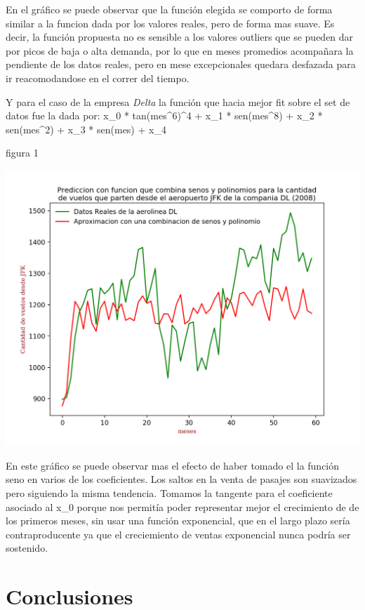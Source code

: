\documentclass{endm}
\begin{document}
En el gr\'afico se puede observar que la funci\'on elegida se comporto de forma similar a la funcion dada por los valores reales, pero de forma mas suave. Es decir, la funci\'on propuesta no es sensible a los valores outliers que se pueden dar por picos de baja o alta demanda, por lo que en meses promedios acompa\~nara la pendiente de los datos reales, pero en mese excepcionales quedara desfazada para ir reacomodandose en el correr del tiempo.

Y para el caso de la empresa \textit{Delta} la funci\'on que hacia mejor fit sobre el set de datos fue la dada por:
x_0 * tan(mes^6)^4 + x_1 * sen(mes^8) + x_2 * sen(mes^2) + x_3 * sen(mes) +  x_4


\begin{center}
\caption{figura 1}
\includegraphics[scale=0.5]{imagenes/DL.png}
\end{center}

En este gr\'afico se puede observar mas el efecto de haber tomado el la funci\'on seno en varios de los coeficientes. Los saltos en la venta de pasajes son suavizados pero siguiendo la misma tendencia. Tomamos la tangente para el coeficiente asociado al x_0 porque nos permit\'ia poder representar mejor el crecimiento de de los primeros meses, sin usar una funci\'on exponencial, que en el largo plazo ser\'ia contraproducente ya que el creciemiento de ventas exponencial nunca podr\'ia ser sostenido.



\section{Conclusiones}
\end{document}

